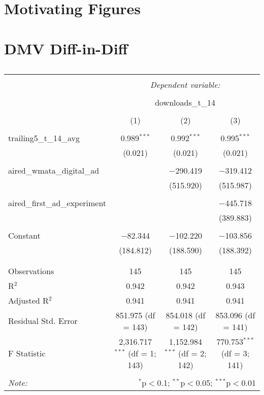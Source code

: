 \documentclass[11pt, letterpaper, twoside]{article}
\begin{document}
\section{Motivating Figures}

\section{DMV Diff-in-Diff}

\begin{table}[!htbp] \centering 
    \caption{} 
    \label{}   
  \begin{tabular}{@{\extracolsep{5pt}}lccc}
  \\[-1.8ex]\hline
  \hline \\[-1.8ex]
   & \multicolumn{3}{c}{\textit{Dependent variable:}} \\
  \cline{2-4}
  \\[-1.8ex] & \multicolumn{3}{c}{downloads\_t\_14} \\
  \\[-1.8ex] & (1) & (2) & (3)\\ 
  \hline \\[-1.8ex]
   trailing5\_t\_14\_avg & 0.989$^{***}$ & 0.992$^{***}$ & 0.995$^{***}$ \\
    & (0.021) & (0.021) & (0.021) \\ 
    & & & \\
   aired\_wmata\_digital\_ad &  & $-$290.419 & $-$319.412 \\
    &  & (515.920) & (515.987) \\
    & & & \\ 
   aired\_first\_ad\_experiment &  &  & $-$445.718 \\
    &  &  & (389.883) \\
    & & & \\
   Constant & $-$82.344 & $-$102.220 & $-$103.856 \\
    & (184.812) & (188.590) & (188.392) \\ 
    & & & \\
  \hline \\[-1.8ex]
  Observations & 145 & 145 & 145 \\
  R$^{2}$ & 0.942 & 0.942 & 0.943 \\
  Adjusted R$^{2}$ & 0.941 & 0.941 & 0.941 \\
  Residual Std. Error & 851.975 (df = 143) & 854.018 (df = 142) & 853.096 (df = 141) \\ 
  F Statistic & 2,316.717$^{***}$ (df = 1; 143) & 1,152.984$^{***}$ (df = 2; 142) & 770.753$^{***}$ (df 
  = 3; 141) \\
  \hline
  \hline \\[-1.8ex]
  \textit{Note:}  & \multicolumn{3}{r}{$^{*}$p$<$0.1; $^{**}$p$<$0.05; $^{***}$p$<$0.01} \\
  \end{tabular}
  \end{table}
\end{document}
